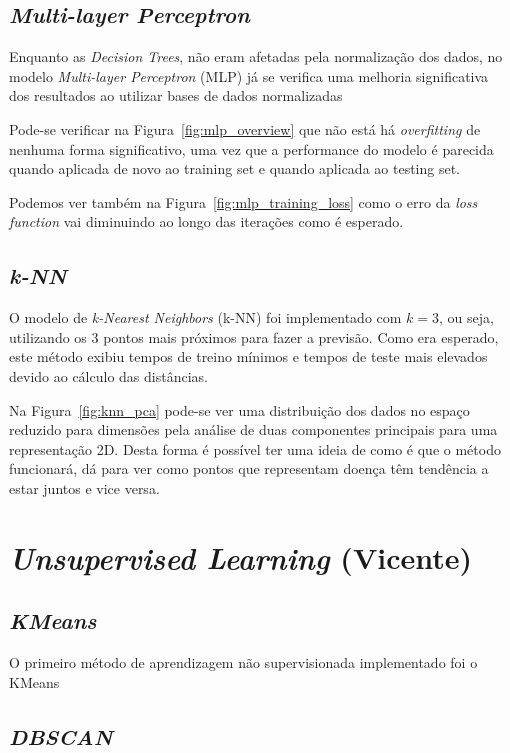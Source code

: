 \subsection{\textit{Multi-layer Perceptron}}
\label{chap4:percetrao}

Enquanto as \textit{Decision Trees}, não eram afetadas pela normalização dos dados, no modelo \textit{Multi-layer Perceptron} (MLP) já se verifica uma melhoria significativa dos resultados ao utilizar bases de dados normalizadas

Pode-se verificar na Figura~\ref{fig:mlp_overview} que não está há \textit{overfitting} de nenhuma forma significativo, uma vez que a performance do modelo é parecida quando aplicada de novo ao training set e quando aplicada ao testing set.

Podemos ver também na Figura~\ref{fig:mlp_training_loss} como o erro da \textit{loss function} vai diminuindo ao longo das iterações como é esperado.



\subsection{\textit{k-NN}}
\label{chap4:k-nn}

O modelo de \textit{k-Nearest Neighbors} (k-NN) foi implementado com \(k=3\), ou seja, utilizando os 3 pontos mais próximos para fazer a previsão. Como era esperado, este método exibiu tempos de treino mínimos e tempos de teste mais elevados devido ao cálculo das distâncias. 

Na Figura~\ref{fig:knn_pca} pode-se ver uma distribuição dos dados no espaço reduzido para dimensões pela análise de duas componentes principais para uma representação 2D. Desta forma é possível ter uma ideia de como é que o método funcionará, dá para ver como pontos que representam doença têm tendência a estar juntos e vice versa.








\section{\textit{Unsupervised Learning} (Vicente)}
\label{chap4:unsuper}

\subsection{\textit{KMeans}}
\label{chap4:kmenas}

O primeiro método de aprendizagem não supervisionada implementado foi o KMeans

\subsection{\textit{DBSCAN}}
\label{chap4:dbscan}